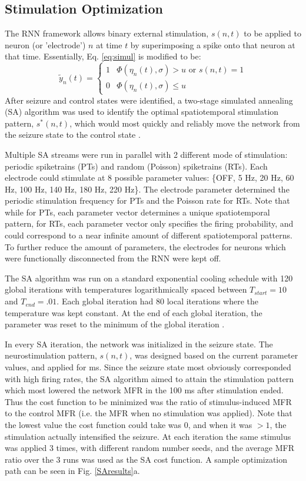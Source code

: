 \documentclass[11pt,a4paper,final]{article}
\begin{document}
\subsection{Stimulation Optimization}
The RNN framework allows binary external stimulation, $s(n,t)$ to be applied to neuron (or 'electrode') $n$ at time $t$ by superimposing a spike onto that neuron at that time.
Essentially, Eq. \ref{eq:simul} is modified to be:
\begin{equation}
\tilde{y}_n(t) =
\begin{cases}
1   & \Phi(\eta_n(t),\sigma) > u \text{ or } s(n,t)=1 \\
0   & \Phi(\eta_n(t),\sigma) \leq u
\end{cases}
\label{eq:stim}
\end{equation}
After seizure and control states were identified, a two-stage simulated annealing (SA) algorithm was used to identify the optimal spatiotemporal stimulation pattern, $s^*(n,t)$, which would most quickly and reliably move the network from the seizure state to the control state \citep{kirkpatrick83}.

Multiple SA streams were run in parallel with 2 different mode of stimulation: periodic spiketrains (PTs) and random (Poisson) spiketrains (RTs).
Each electrode could stimulate at 8 possible parameter values: \{OFF, 5 Hz, 20 Hz, 60 Hz, 100 Hz, 140 Hz, 180 Hz, 220 Hz\}.
The electrode parameter determined the periodic stimulation frequency for PTs and the Poisson rate for RTs.
Note that while for PTs, each parameter vector determines a unique spatiotemporal pattern, for RTs, each parameter vector only specifies the firing probability, and could correspond to a near infinite amount of different spatiotemporal patterns.
To further reduce the amount of parameters, the electrodes for neurons which were functionally disconnected from the RNN were kept off.

The SA algorithm was run on a standard exponential cooling schedule with 120 global iterations with temperatures logarithmically spaced between $T_{start}=10$ and $T_{end}=.01$.
Each global iteration had 80 local iterations where the temperature was kept constant.
At the end of each global iteration, the parameter was reset to the minimum of the global iteration \citep{henderson03}.

In every SA iteration, the network was initialized in the seizure state.
The neurostimulation pattern, $s(n,t)$, was designed based on the current parameter values, and applied for \len ms.
Since the seizure state most obviously corresponded with high firing rates, the SA algorithm aimed to attain the stimulation pattern which most lowered the network MFR in the 100 ms after stimulation ended.
Thus the cost function to be minimized was the ratio of stimulus-induced MFR to the control MFR (i.e. the MFR when no stimulation was applied).
Note that the lowest value the cost function could take was 0, and when it was $>1$, the stimulation actually intensified the seizure.
At each iteration the same stimulus was applied 3 times, with different random number seeds, and the average MFR ratio over the 3 runs was used as the SA cost function.
A sample optimization path can be seen in Fig. \ref{SAresults}a.
\end{document}

